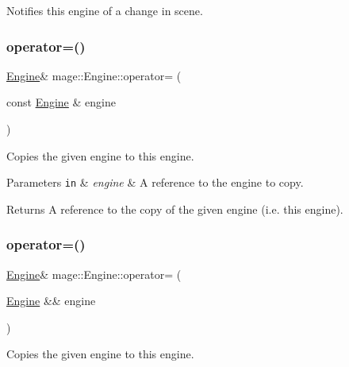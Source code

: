 Notifies this engine of a change in scene. \hypertarget{classmage_1_1_engine_a1eedff82d4c8207c61676230520648fd}{}\label{classmage_1_1_engine_a1eedff82d4c8207c61676230520648fd} 
\subsubsection{\texorpdfstring{operator=()}{operator=()}\hspace{0.1cm}{\footnotesize\ttfamily [1/2]}}
{\footnotesize\ttfamily \hyperlink{classmage_1_1_engine}{Engine}\& mage\+::\+Engine\+::operator= (\begin{DoxyParamCaption}\item[{const \hyperlink{classmage_1_1_engine}{Engine} \&}]{engine }\end{DoxyParamCaption})\hspace{0.3cm}{\ttfamily [delete]}}

Copies the given engine to this engine.


\begin{DoxyParams}[1]{Parameters}
\mbox{\tt in}  & {\em engine} & A reference to the engine to copy. \\
\hline
\end{DoxyParams}
\begin{DoxyReturn}{Returns}
A reference to the copy of the given engine (i.\+e. this engine). 
\end{DoxyReturn}
\hypertarget{classmage_1_1_engine_a22607a263e0be5e179cc0e4bf13b18f7}{}\label{classmage_1_1_engine_a22607a263e0be5e179cc0e4bf13b18f7} 
\subsubsection{\texorpdfstring{operator=()}{operator=()}\hspace{0.1cm}{\footnotesize\ttfamily [2/2]}}
{\footnotesize\ttfamily \hyperlink{classmage_1_1_engine}{Engine}\& mage\+::\+Engine\+::operator= (\begin{DoxyParamCaption}\item[{\hyperlink{classmage_1_1_engine}{Engine} \&\&}]{engine }\end{DoxyParamCaption})\hspace{0.3cm}{\ttfamily [delete]}}

Copies the given engine to this engine.


